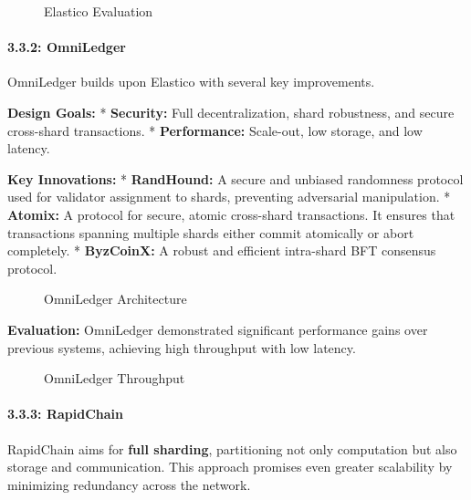 \begin{figure}
\centering
\caption{Elastico Evaluation}
\end{figure}

\paragraph{3.3.2: OmniLedger}\label{omniledger}

OmniLedger builds upon Elastico with several key improvements.

\textbf{Design Goals:} * \textbf{Security:} Full decentralization, shard
robustness, and secure cross-shard transactions. * \textbf{Performance:}
Scale-out, low storage, and low latency.

\textbf{Key Innovations:} * \textbf{RandHound:} A secure and unbiased
randomness protocol used for validator assignment to shards, preventing
adversarial manipulation. * \textbf{Atomix:} A protocol for secure,
atomic cross-shard transactions. It ensures that transactions spanning
multiple shards either commit atomically or abort completely. *
\textbf{ByzCoinX:} A robust and efficient intra-shard BFT consensus
protocol.

\begin{figure}
\centering
\caption{OmniLedger Architecture}
\end{figure}

\textbf{Evaluation:} OmniLedger demonstrated significant performance
gains over previous systems, achieving high throughput with low latency.

\begin{figure}
\centering
\caption{OmniLedger Throughput}
\end{figure}

\paragraph{3.3.3: RapidChain}\label{rapidchain}

RapidChain aims for \textbf{full sharding}, partitioning not only
computation but also storage and communication. This approach promises
even greater scalability by minimizing redundancy across the network.

